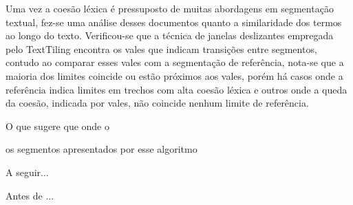 Uma vez a coesão léxica é pressuposto de muitas abordagens em segmentação textual, fez-se uma análise desses documentos quanto a similaridade dos termos ao longo do texto. Verificou-se que a técnica de janelas deslizantes empregada pelo TextTiling encontra os vales que indicam transições entre segmentos, contudo ao comparar esses vales com a segmentação de referência, nota-se que a maioria dos limites coincide  ou estão próximos aos vales, porém há casos onde a referência indica limites em trechos com alta coesão léxica e outros onde a queda da coesão, indicada por vales, não coincide nenhum limite de referência. 

O que sugere que  onde o

os segmentos apresentados por esse algoritmo 










A seguir...

Antes de ...



	












